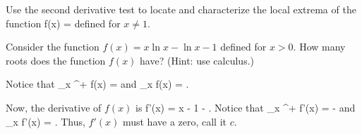 \documentclass[11pt]{amsart}
\begin{document}
\newpage

\begin{eg}
Use the second derivative test to locate and characterize the local extrema of the function 
\beqn
f(x) = 
\eeqn
defined for $x \ne 1$.
\end{eg}

\newpage

\begin{eg} Consider the function $f(x) = x \ln x - \ln x - 1$ defined for $x > 0$. 
How many roots does the function $f(x)$ have? 
(Hint: use calculus.)
\end{eg} 

\newpage 

Notice that 
\beqn
\lim_{x ^+} f(x) = \infty 
\eeqn
and 
\beqn
\lim_{x \to \infty} f(x) = \infty .
\eeqn

Now, the derivative of $f(x)$ is
\beqn
f'(x) = \ln x - 1 -  . 
\eeqn
Notice that 
\beqn
\lim_{x ^+} f'(x) = - \infty 
\eeqn
and 
\beqn
\lim_{x \to \infty} f'(x) = \infty .
\eeqn
Thus, $f'(x)$ must have a zero, call it $c$. 

\end{document}

